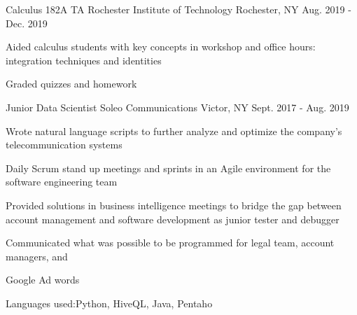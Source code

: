 \begin{cventries}
{\begin{cvitems}
      \end{cvitems}
    }
    \cventry
    {Calculus 182A TA}
    {Rochester Institute of Technology}
    {Rochester, NY}
    {Aug. 2019 - Dec. 2019}
    {
      \begin{cvitems}
        \item {Aided calculus students with key concepts in workshop and office hours: integration techniques and identities}
        \item {Graded quizzes and homework}
      \end{cvitems}
    }
  \cventry
    {Junior Data Scientist}
    {Soleo Communications}
    {Victor, NY}
    {Sept. 2017 - Aug. 2019}
    {
      \begin{cvitems}
        \item {Wrote natural language scripts to further analyze and optimize the company's telecommunication systems}
        \item {Daily Scrum stand up meetings and sprints in an Agile environment for the software engineering team}
        \item {Provided solutions in business intelligence meetings to bridge the gap between account management and software development as junior tester and debugger}
        \item{Communicated what was possible to be programmed for legal team, account managers, and }
        \item{Google Ad words}
        \item{Languages used:Python, HiveQL, Java, Pentaho}
      \end{cvitems}
    }


\end{cventries}
